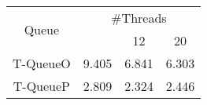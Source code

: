 \begin{tabular}{|c|c|c|c|}
\hline
\multirow{2}{*}{Queue} & \multicolumn{3}{c|}{\#Threads}\\\cline{2-4}& \quad 4 & 12 & 20\\
\hline
\hline
T-QueueO & 9.405 & 6.841 & 6.303\\
T-QueueP & 2.809 & 2.324 & 2.446\\
\hline\end{tabular}
